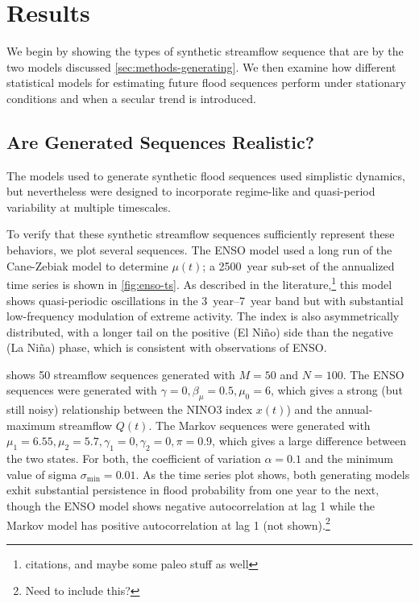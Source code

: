 \documentclass[12pt]{article}
\begin{document}
\section{Results}

We begin by showing the types of synthetic streamflow sequence that are by the two models discussed \cref{sec:methods-generating}.
We then examine how different statistical models for estimating future flood sequences perform under stationary conditions and when a secular trend is introduced.

\subsection{Are Generated Sequences Realistic?\label{sec:sequence-realistic}}

The models used to generate synthetic flood sequences used simplistic dynamics, but nevertheless were designed to incorporate regime-like and quasi-period variability at multiple timescales.

To verify that these synthetic streamflow sequences sufficiently represent these behaviors, we plot several sequences.
The ENSO model used a long run of the Cane-Zebiak model \citep{Zebiak1987,Ramesh2017} to determine \(\mu(t)\); a \SI{2500}{year} sub-set of the annualized time series is shown in \cref{fig:enso-ts}.
As described in the literature,\footnote{citations, and maybe some paleo stuff as well} this model shows quasi-periodic oscillations in the \SIrange{3}{7}{year} band but with substantial low-frequency modulation of extreme activity.
The index is also asymmetrically distributed, with a longer tail on the positive (El Ni\~{n}o) side than the negative (La Ni\~{n}a) phase, which is consistent with observations of ENSO.

 shows 50 streamflow sequences generated with \(M=50\) and \(N=100\).
The ENSO sequences were generated with \(\gamma=0, \beta_\mu=0.5, \mu_0=6\), which gives a strong (but still noisy) relationship between the NINO3 index \(x(t)\)) and the annual-maximum streamflow \(Q(t)\).
The Markov sequences were generated with \(\mu_1 = 6.55, \mu_2=5.7, \gamma_1=0, \gamma_2=0, \pi=0.9\), which gives a large difference between the two states.
For both, the coefficient of variation \(\alpha=0.1\) and the minimum value of sigma \(\sigma_\text{min}=0.01\).
As the time series plot shows, both generating models exhit substantial persistence in flood probability from one year to the next, though the ENSO model shows negative autocorrelation at lag 1 while the Markov model has positive autocorrelation at lag 1 (not shown).\footnote{Need to include this?}
\end{document}
